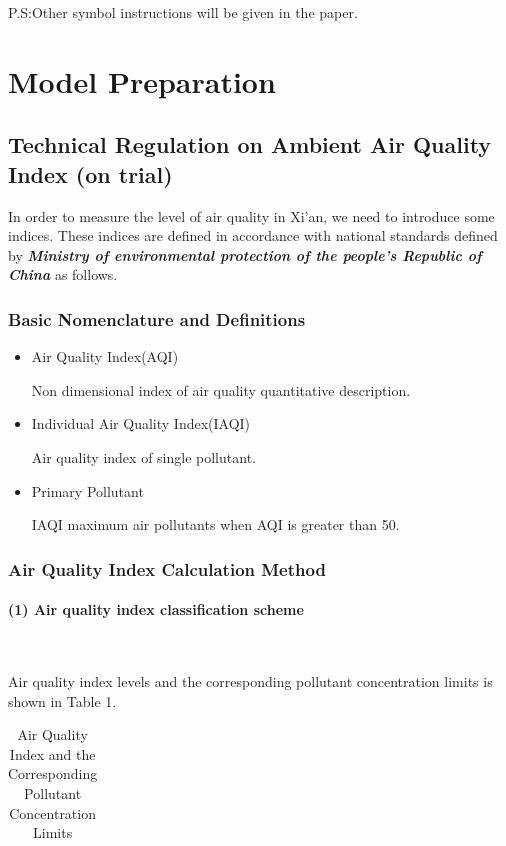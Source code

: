 \documentclass[a4paper,11pt]{article}
\begin{document}
P.S:Other symbol instructions will be given in the paper.


\section{Model Preparation}
\subsection{Technical Regulation on Ambient Air Quality Index (on trial)\cite{RA}}
In order to measure the level of air quality in Xi'an, we need to introduce some indices. These indices are defined in accordance with national standards defined by \textbf{\emph{Ministry of environmental protection of the people's Republic of China}} as follows.
\subsubsection{Basic Nomenclature and Definitions}
\begin{itemize}
\item Air Quality Index(AQI)
\par Non dimensional index of air quality quantitative description.
\item Individual Air Quality Index(IAQI)
\par Air quality index of single pollutant.
\item Primary Pollutant
\par IAQI maximum air pollutants when AQI is greater than 50.
\end{itemize}

\subsubsection{Air Quality Index Calculation Method}


\paragraph{(1) Air quality index classification scheme}
\textrm{\\}
\par Air quality index levels and the corresponding pollutant concentration limits is shown in Table 1.
\begin{table}[!ht]
\centering
 \caption{\label{tab:test}Air Quality Index and the Corresponding Pollutant Concentration Limits}
 \begin{tabular}{ccccc}
  \toprule
  \midrule
  \bottomrule
 \end{tabular}
\label{tab:AQI} %
\end{table}
\end{document}
